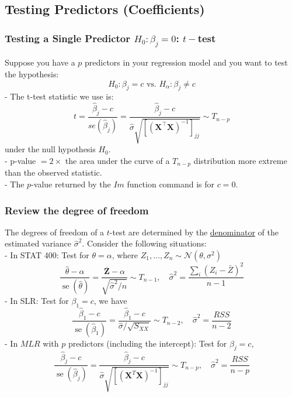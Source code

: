 \documentclass[11pt,a4paper]{article}
\begin{document}
\subsection{Testing Predictors (Coeﬃcients)}
\subsubsection{Testing a Single Predictor $H_0: \beta_j=0$: $t-$test}
Suppose you have a $p$ predictors in your regression model and you want to test the hypothesis:
$$
H_{0}: \beta_{j}=c \text { vs. } H_{\alpha}: \beta_{j} \neq c
$$
- The t-test statistic we use is:
$$
t=\frac{\hat{\beta}_{j}-c}{s e\left(\hat{\beta}_{j}\right)}=\frac{\hat{\beta}_{j}-c}{\hat{\sigma} \sqrt{\left[\left(\mathbf{X}^{\top} \mathbf{X}\right)^{-1}\right]_{j j}}} \sim T_{n-p}
$$
under the null hypothesis $H_{0}$.\\
- p-value $=2 \times$ the area under the curve of a $T_{n-p}$ distribution more extreme than the observed statistic.\\
- The $p$-value returned by the $I m$ function command is for $c=0$.
\subsubsection{Review the degree of freedom}
The degrees of freedom of a $t$-test are determined by the \underline{denominator} of the estimated variance $\hat{\sigma}^{2}$. Consider the following situations:\\
- In STAT 400: Test for $\theta=\alpha$, where $Z_{1}, \ldots, Z_{n} \sim \mathcal{N}\left(\theta, \sigma^{2}\right)$
$$
\frac{\hat{\theta}-\alpha}{\operatorname{se}(\hat{\theta})}=\frac{\overline{\mathbf{Z}}-\alpha}{\sqrt{\hat{\sigma}^{2} / n}} \sim T_{n-1}, \quad \hat{\sigma}^{2}=\frac{\sum_{i}\left(Z_{i}-\bar{Z}\right)^{2}}{n-1}
$$
- In SLR: Test for $\beta_{1}=c$, we have
$$
\frac{\hat{\beta}_{1}-c}{\operatorname{se}\left(\hat{\beta}_{1}\right)}=\frac{\hat{\beta}_{1}-c}{\hat{\sigma} / \sqrt{S_{X X}}} \sim T_{n-2},\quad \hat{\sigma}^{2}=\frac{R S S}{n-2}
$$
- In $M L R$ with $p$ predictors (including the intercept): Test for $\beta_{j}=c$,
$$
\frac{\hat{\beta}_{j}-c}{\operatorname{se}\left(\hat{\beta}_{j}\right)}=\frac{\hat{\beta}_{j}-c}{\hat{\sigma} \sqrt{\left[\left(\mathbf{X}^{T} \mathbf{X}\right)^{-1}\right]_{j j}}} \sim T_{n-p}, \quad\hat{\sigma}^{2}=\frac{R S S}{n-p}
$$
\end{document}
